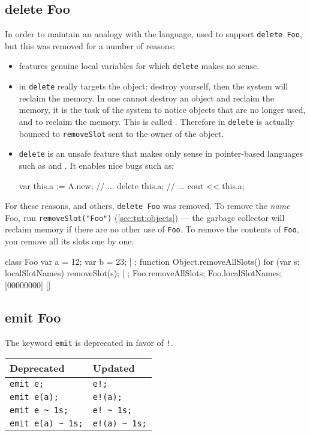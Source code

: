 \subsection{delete Foo}
\label{sec:k122:delete}
In order to maintain an analogy with the \Cxx language, \us used to
support \lstinline{delete Foo}, but this was removed for a number of
reasons:
\begin{itemize}
\item {} features genuine local variables for which
  \lstinline{delete} makes no sense.
\item in \Cxx \lstinline{delete} really targets the object: destroy
  yourself, then the system will reclaim the memory.  In \us one
  cannot destroy an object and reclaim the memory, it is the task of
  the system to notice objects that are no longer used, and to reclaim
  the memory.  This is called .  Therefore in
  \us \lstinline{delete} is actually bounced to \lstinline{removeSlot}
  sent to the owner of the object.
\item \lstinline{delete} is an unsafe feature that makes only sense in
  pointer-based languages such as \C and \Cxx.  It enables nice bugs
  such as:
\begin{urbifixme}
var this.a := A.new;
// ...
delete this.a;
// ...
cout << this.a;
\end{urbifixme}
\end{itemize}

For these reasons, and others, \lstinline{delete Foo} was removed.
To remove the \emph{name} Foo, run
{\lstinline{removeSlot("Foo")}} (\autoref{sec:tut:objects}) --- the
garbage collector will reclaim memory if there are no other use of
\lstinline{Foo}.  To remove the contents of
\lstinline{Foo}, you remove all its slots one by one:

\begin{urbiscript}
class Foo
{
  var a = 12;
  var b = 23;
} | {};
function Object.removeAllSlots()
{
  for (var s: localSlotNames)
    removeSlot(s);
} | {};
Foo.removeAllSlots;
Foo.localSlotNames;
[00000000] []
\end{urbiscript}

\subsection{emit Foo}

The keyword \lstinline{emit} is deprecated in favor of \lstinline{!}.

\begin{center}
  \begin{tabular}{|l|l|}
    \hline
    \textbf{Deprecated} & \textbf{Updated}  \\
    \hline
    \lstinline|emit e;|         & \lstinline|e!;|          \\
    \lstinline|emit e(a);|      & \lstinline|e!(a);|       \\
    \lstinline|emit e ~ 1s;|    & \lstinline|e! ~ 1s;|     \\
    \lstinline|emit e(a) ~ 1s;| & \lstinline|e!(a) ~ 1s;|  \\
    \hline
  \end{tabular}
\end{center}

